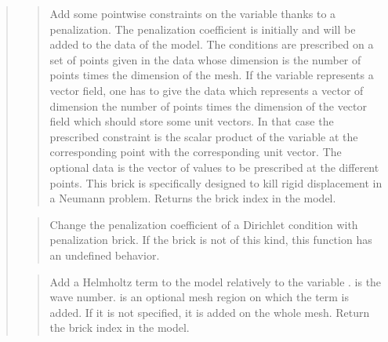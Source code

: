 \documentclass[a4paper,11pt,english]{sphinxmanual}
\begin{document}
\begin{quote}
\begin{quote}
\sphinxAtStartPar
Add some pointwise constraints on the variable  thanks to
a penalization. The penalization coefficient is initially
 and will be added to the data of the model.
The conditions are prescribed on a set of points given in the data
 whose dimension is the number of points times the dimension
of the mesh.
If the variable represents a vector field, one has to give the data
 which represents a vector of dimension the number of
points times the dimension of the vector field which should store some
unit vectors. In that case the prescribed constraint is the scalar
product of the variable at the corresponding point with the corresponding
unit vector.
The optional data  is the vector of values to be prescribed
at the different points.
This brick is specifically designed to kill rigid displacement
in a Neumann problem.
Returns the brick index in the model.
\end{quote}

\sphinxAtStartPar
{}
\begin{quote}

\sphinxAtStartPar
Change the penalization coefficient of a Dirichlet condition with
penalization brick. If the brick is not of this kind, this
function has an undefined behavior.
\end{quote}

\sphinxAtStartPar
{}
\begin{quote}

\sphinxAtStartPar
Add a Helmholtz term to the model relatively to the variable .
 is the wave number.  is an optional mesh
region on which the term is added. If it is not specified, it is added
on the whole mesh. Return the brick index in the model.
\end{quote}

\sphinxAtStartPar
{}
\begin{quote}


\end{quote}
\end{quote}
\end{document}
